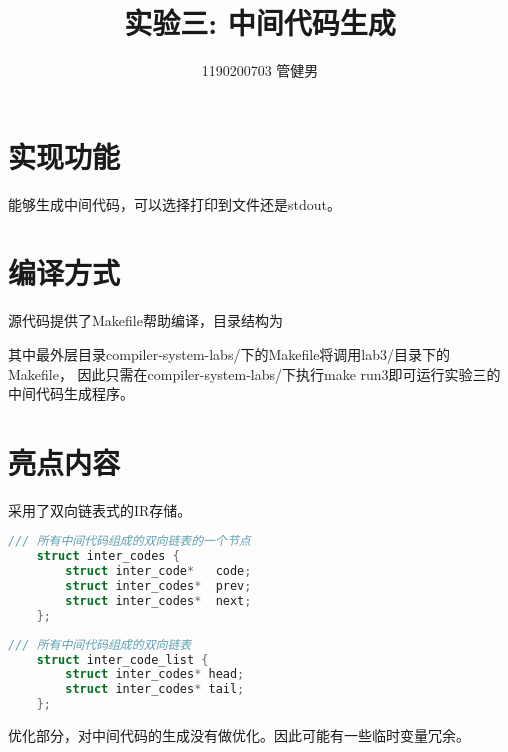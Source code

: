 \documentclass{article}
\title{实验三: 中间代码生成}
\author{1190200703 管健男}
\date{}
\begin{document}
\maketitle


\section{实现功能}

能够生成中间代码，可以选择打印到文件还是stdout。

\section{编译方式}

源代码提供了Makefile帮助编译，目录结构为

\begin{figure}[H]
    \centering
    \begin{minipage}{0.4\linewidth}
    \end{minipage}
\end{figure}

其中最外层目录compiler-system-labs/下的Makefile将调用lab3/目录下的Makefile，
因此只需在compiler-system-labs/下执行make run3即可运行实验三的中间代码生成程序。

\section{亮点内容}

采用了双向链表式的IR存储。

\begin{lstlisting}[language=C, caption=双向链表节点结构体声明]
    /// 所有中间代码组成的双向链表的一个节点
    struct inter_codes {
        struct inter_code*   code;
        struct inter_codes*  prev;
        struct inter_codes*  next;
    };
\end{lstlisting}

\begin{lstlisting}[language=C, caption=双向链表节点结构体声明]
    /// 所有中间代码组成的双向链表
    struct inter_code_list {
        struct inter_codes* head;
        struct inter_codes* tail;
    };
\end{lstlisting}

优化部分，对中间代码的生成没有做优化。因此可能有一些临时变量冗余。
\end{document}
